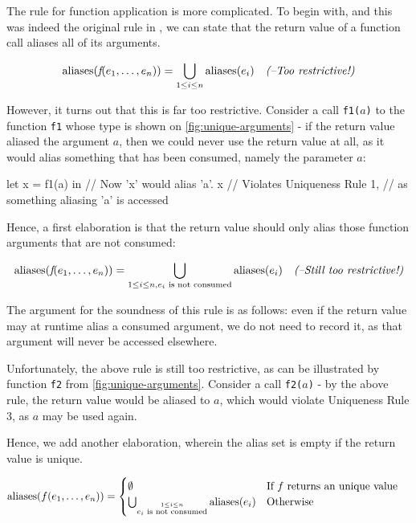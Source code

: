 The rule for function application is more complicated.  To begin with,
and this was indeed the original rule in \LO{}, we can state that the
return value of a function call aliases all of its arguments.

\begin{align*}
  \textrm{aliases}(\textit{f}(e_{1}, \ldots, e_{n})) &= \bigcup_{1 \leq i \leq n} \textrm{aliases}(e_{i}) & \textit{(--Too restrictive!)}
\end{align*}

However, it turns out that this is far too restrictive.  Consider a
call \texttt{f1($a$)} to the function \texttt{f1} whose type is shown
on \cref{fig:unique-arguments} - if the return value aliased the
argument $a$, then we could never use the return value at all, as it
would alias something that has been consumed, namely the parameter
$a$:

\begin{colorcode}
let x = f1(a) in // Now 'x' would alias 'a'.
x                // Violates Uniqueness Rule 1,
                 // as something aliasing 'a' is accessed
\end{colorcode}

Hence, a first elaboration is that the return value should only alias
those function arguments that are not consumed:

\begin{align*}
  \textrm{aliases}(\textit{f}(e_{1}, \ldots, e_{n})) &= \bigcup_{1 \leq i \leq n, \text{$e_{i}$ is not consumed}} \textrm{aliases}(e_{i})  & \textit{(--Still too restrictive!)}
\end{align*}

The argument for the soundness of this rule is as follows: even if the
return value may at runtime alias a consumed argument, we do not need
to record it, as that argument will never be accessed elsewhere.

Unfortunately, the above rule is still too restrictive, as can be
illustrated by function \texttt{f2} from \cref{fig:unique-arguments}.
Consider a call \texttt{f2($a$)} - by the above rule, the return value
would be aliased to $a$, which would violate Uniqueness Rule 3, as $a$
may be used again.

Hence, we add another elaboration, wherein the alias set is empty if
the return value is unique.

\begin{align*}
  \textrm{aliases}(f(e_{1}, \ldots, e_{n})) &=
  \begin{cases}
    \emptyset & \mbox{If $f$ returns an unique value}\\
    \bigcup_{\overset{1 \leq i \leq n}{\text{$e_{i}$ is not consumed}}} \textrm{aliases}(e_{i}) & \mbox{Otherwise}
  \end{cases}
\end{align*}

